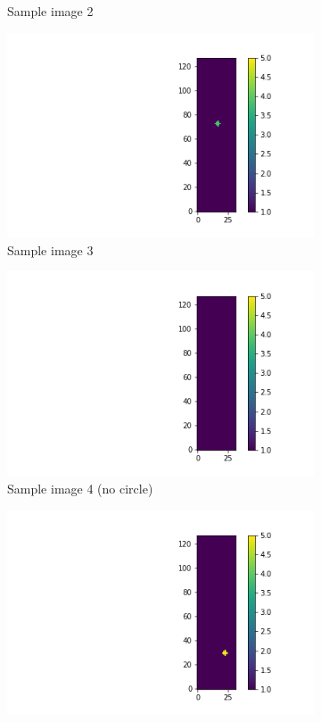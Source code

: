 \documentclass{article}
\begin{document}
\begin{figure}
\begin{subfigure}[b]{0.45\textwidth}
    \caption{Sample image 2}
  \end{subfigure}
  \begin{subfigure}[b]{0.45\textwidth}
    \centering
    \includegraphics[totalheight=4cm]{circle_id/sample2.png}
    \caption{Sample image 3}
  \end{subfigure}
  \begin{subfigure}[b]{0.45\textwidth}
    \centering
    \includegraphics[totalheight=4cm]{circle_id/sample3.png}
    \caption{Sample image 4 (no circle)}
  \end{subfigure}
  \begin{subfigure}[b]{0.45\textwidth}
    \centering
    \includegraphics[totalheight=4cm]{circle_id/sample4.png}

\end{subfigure}
\end{figure}
\end{document}
